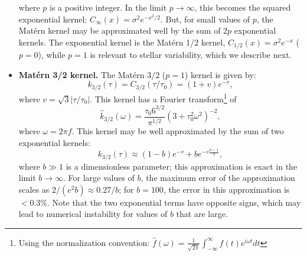 \documentclass[manuscript, letterpaper]{aastex6}
\begin{document}
\begin{itemize}
where $p$ is a positive integer.  In the limit $p\rightarrow \infty$, this becomes the
squared exponential kernel: $C_\infty(x) = \sigma^2 e^{-x^2/2}$.  But, for small
values of $p$, the Mat\'ern kernel may be approximated well by the sum of
$2p$ exponential kernels.  The exponential kernel is the Mat\'ern 1/2 kernel,
$C_{1/2}(x) = \sigma^2 e^{-x}$ ($p=0$), while
$p=1$ is relevant to stellar variability, which we describe next.
\item {\bf Mat\'ern 3/2 kernel.}  The Mat\'ern $3/2$ ($p=1$) kernel is given by:
\begin{equation}
k_{3/2}(\tau) = C_{3/2}(\tau/\tau_0) = (1+v)e^{-v},
\end{equation}
where $v = \sqrt{3}\vert \tau/\tau_0\vert$.  This kernel has a Fourier transform\footnote{Using the normalization convention:
$\hat f(\omega) = \frac{1}{\sqrt{2\pi}} \int_{-\infty}^\infty f(t) e^{i\omega t} dt$}  of
\begin{equation}
\hat k_{3/2}(\omega) = \frac{\tau_0 6^{3/2}}{\pi^{1/2}} (3+\tau_0^2\omega^2)^{-2},
\end{equation}
where $\omega = 2\pi f$.  This kernel may be well approximated by the sum of two exponential kernels:
\begin{equation}
k_{3/2}(\tau) \approx (1-b)e^{-v}+be^{-v\frac{b-1}{b}},
\end{equation}
where $b \gg 1$ is a dimensionless parameter; this approximation is exact in the limit $b \rightarrow \infty$.  For
large values of $b$, the maximum error of the approximation scales as $2/(e^2b) \approx 0.27/b$; for
$b=100$, the error in this approximation is $<0.3$\%.  Note that the two exponential terms
have opposite signs, which may lead to numerical instability for values of $b$ that
are large.


\end{itemize}
\end{document}
